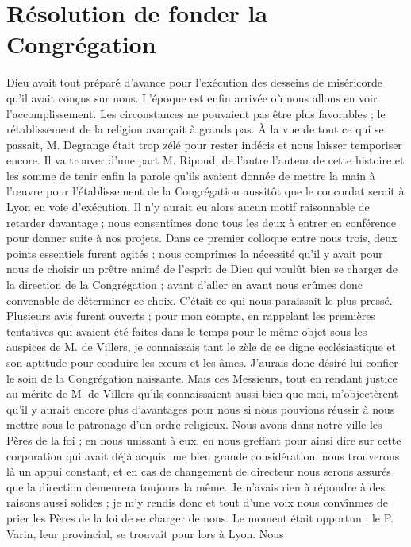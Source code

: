 \section*{Résolution de fonder la Congrégation}
Dieu avait tout préparé d'avance pour l'exécution des desseins de miséricorde qu'il avait conçus sur nous. L'époque est enfin arrivée où nous allons en voir l'accomplissement. Les circonstances ne pouvaient pas être plus favorables ; le rétablissement de la religion avançait à grands pas. À la vue de tout ce qui se passait, M. Degrange était trop zélé pour rester indécis et nous laisser temporiser encore. Il va trouver d'une part M. Ripoud, de l'autre l'auteur de cette histoire et les somme de tenir enfin la parole qu'ils avaient donnée de mettre la main à l'œuvre pour l'établissement de la Congrégation aussitôt que le concordat serait à Lyon en voie d'exécution. Il n'y aurait eu alors aucun motif raisonnable de retarder davantage ; nous consentîmes donc tous les deux à entrer en conférence
pour donner suite à nos projets. Dans ce premier colloque entre nous trois, deux points essentiels furent agités ; nous comprîmes la nécessité qu'il y avait pour nous de choisir un prêtre animé de l'esprit de Dieu qui voulût bien se charger de la direction de la Congrégation ; avant d'aller en avant nous crûmes donc convenable de déterminer ce choix. C'était ce qui nous paraissait le plus pressé. Plusieurs avis furent ouverts ; pour mon compte, en rappelant les premières tentatives qui avaient été faites dans le temps pour le même objet sous les auspices de M. de Villers, je connaissais tant le zèle de ce digne ecclésiastique et son aptitude pour conduire les cœurs et les âmes. J'aurais donc désiré lui confier le soin de la Congrégation naissante. Mais ces Messieurs, tout en rendant justice au mérite de M. de Villers qu'ils connaissaient aussi bien que moi, m'objectèrent qu'il y aurait encore plus d'avantages pour nous si nous pouvions réussir à nous mettre sous le patronage d'un ordre religieux. Nous avons dans notre ville les Pères de la foi ; en nous unissant à eux, en nous greffant pour ainsi dire sur cette corporation qui avait déjà acquis une bien grande considération, nous trouverons là un appui constant, et en cas de changement de directeur nous serons assurés que la direction demeurera toujours la même. Je n'avais rien à répondre à des raisons aussi solides ; je m'y rendis donc et tout d'une voix nous convînmes de prier les Pères de la foi de se charger de nous. Le moment était opportun ; le P. Varin, leur provincial, se trouvait pour lors à Lyon. Nous
